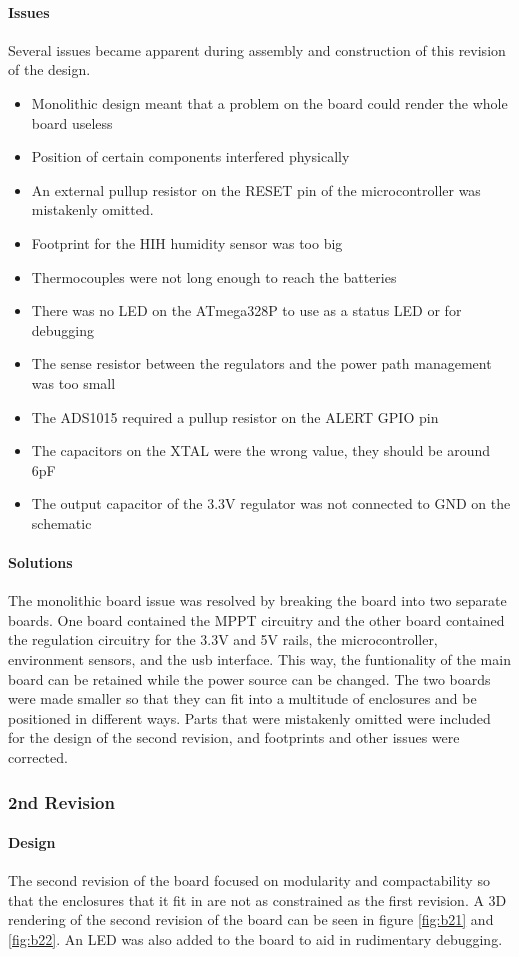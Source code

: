 \documentclass{article}
\numberwithin{figure}{section}
\numberwithin{equation}{section}
\begin{document}
{\paragraph{Issues}
Several issues became apparent during assembly and construction of this revision of the design.
\begin{itemize}
\item Monolithic design meant that a problem on the board could render the whole board useless
\item Position of certain components interfered physically
\item An external pullup resistor on the RESET pin of the microcontroller was mistakenly omitted.
\item Footprint for the HIH humidity sensor was too big
\item Thermocouples were not long enough to reach the batteries
\item There was no LED on the ATmega328P to use as a status LED or for debugging
\item The sense resistor between the regulators and the power path management was too small
\item The ADS1015 required a pullup resistor on the ALERT GPIO pin
\item The capacitors on the XTAL were the wrong value, they should be around 6pF
\item The output capacitor of the 3.3V regulator was not connected to GND on the schematic
\end{itemize}
\paragraph{Solutions}
The monolithic board issue was resolved by breaking the board into two separate boards. One board contained the MPPT circuitry and the other board contained the regulation circuitry for the 3.3V and 5V rails, the microcontroller, environment sensors, and the usb interface. This way, the funtionality of the main board can be retained while the power source can be changed. The two boards were made smaller so that they can fit into a multitude of enclosures and be positioned in different ways. Parts that were mistakenly omitted were included for the design of the second revision, and footprints and other issues were corrected.
\subsubsection{2nd Revision}\label{conclusion-pcb-rev2}
\paragraph{Design}
The second revision of the board focused on modularity and compactability so that the enclosures that it fit in are not as constrained as the first revision. A 3D rendering of the second revision of the board can be seen in figure \ref{fig:b21} and \ref{fig:b22}. An LED was also added to the board to aid in rudimentary debugging.

}
\end{document}
